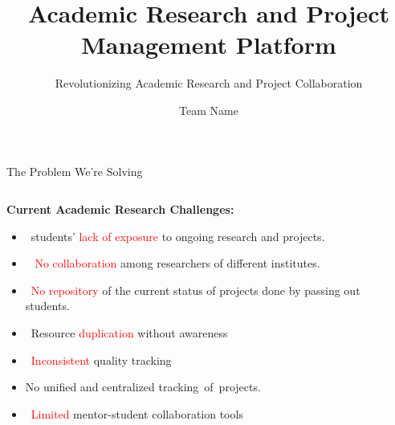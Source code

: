 \documentclass[aspectratio=169]{beamer}
\title[ARPMP]{Academic Research and Project Management Platform}
\subtitle{Revolutionizing Academic Research and Project Collaboration}
\author{Team Name}
\institute{Yukti Innovation Challenge 2025}
\begin{document}
\begin{frame}
\titlepage
\begin{center}
\vspace{-0.5cm}
\textcolor{narmpblue}{\faGlobe} \textcolor{narmporange}{\faUsers} \textcolor{narmpgreen}{\faRocket}
\end{center}
\end{frame}

\begin{frame}{The Problem We're Solving}
\begin{columns}
\begin{column}{0.5\textwidth}
\textbf{Current Academic Research Challenges:}
\begin{itemize}
\item  \faEyeSlash\  students' \textcolor{red}{lack of exposure} to ongoing research and projects.
\item \faExclamationTriangle\ \textcolor{red}{ No collaboration} among researchers of different institutes.
\item \faTrash\ \textcolor{red}{No repository} of the current status of projects done by passing out students.


\item \faCopy\ Resource \textcolor{red}{duplication} without awareness
\item \faChartLine\ \textcolor{red}{Inconsistent} quality tracking
\item  No unified and centralized tracking of projects.
\item \faUsers\ \textcolor{red}{Limited} mentor-student collaboration tools
\end{itemize}
\end{column}
\begin{column}{0.5\textwidth}
\begin{center}
\end{center}
\end{column}
\end{columns}
\end{frame}
\end{document}
